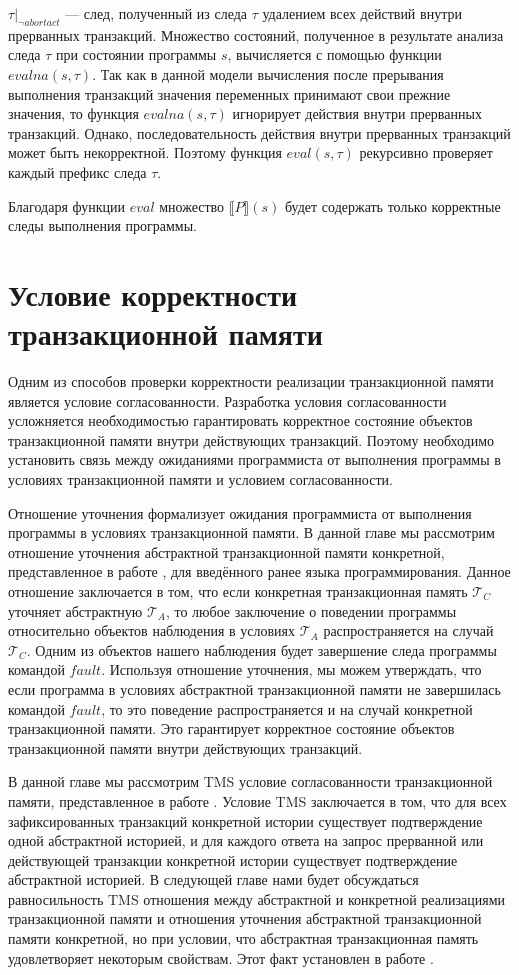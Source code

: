 $\tau |_{\neg abortact}$ --- след, полученный из следа $\tau$ удалением всех действий внутри прерванных транзакций. Множество состояний, полученное в результате анализа следа $\tau$ при состоянии программы $s$, вычисляется с помощью функции $evalna(s, \tau)$. Так как в данной модели вычисления после прерывания выполнения транзакций значения переменных принимают свои прежние значения, то функция $evalna(s, \tau)$ игнорирует действия внутри прерванных транзакций. Однако, последовательность действия внутри прерванных транзакций может быть некорректной. Поэтому функция $eval(s,\tau)$ рекурсивно проверяет каждый префикс следа $\tau$.

Благодаря функции $eval$ множество $\llbracket P \rrbracket(s)$ будет содержать только корректные следы выполнения программы.

\chapter{Условие корректности транзакционной памяти}
Одним из способов проверки корректности реализации транзакционной памяти является условие согласованности. Разработка условия согласованности усложняется необходимостью гарантировать корректное состояние объектов транзакционной памяти внутри действующих транзакций. Поэтому необходимо установить связь между ожиданиями программиста от выполнения программы в условиях транзакционной памяти и условием согласованности. 

Отношение уточнения формализует ожидания программиста от выполнения программы в условиях транзакционной памяти. В данной главе мы рассмотрим отношение уточнения абстрактной транзакционной памяти конкретной, представленное в работе \cite{tms_article}, для введённого ранее языка программирования. Данное отношение заключается в том, что если конкретная транзакционная память $\mathcal{T}_C$ уточняет абстрактную $\mathcal{T}_A$, то любое заключение о поведении программы относительно объектов наблюдения в условиях $\mathcal{T}_A$ распространяется на случай $\mathcal{T}_C$. Одним из объектов нашего наблюдения будет завершение следа программы командой $fault$. Используя отношение уточнения, мы можем утверждать, что если программа в условиях абстрактной транзакционной памяти не завершилась командой $fault$, то это поведение распространяется и на случай конкретной транзакционной памяти. Это гарантирует корректное состояние объектов транзакционной памяти внутри действующих транзакций. 

В данной главе мы рассмотрим TMS условие согласованности транзакционной памяти, представленное в работе \cite{tms_article}. Условие TMS заключается в том, что для всех зафиксированных транзакций конкретной истории существует подтверждение одной абстрактной историей, и для каждого ответа на запрос прерванной или действующей транзакции конкретной истории существует подтверждение абстрактной историей. В следующей главе нами будет обсуждаться равносильность TMS отношения между абстрактной и конкретной реализациями транзакционной памяти и отношения уточнения абстрактной транзакционной памяти конкретной, но при условии, что абстрактная транзакционная память удовлетворяет некоторым свойствам. Этот факт установлен в работе \cite{tms_article}. 

